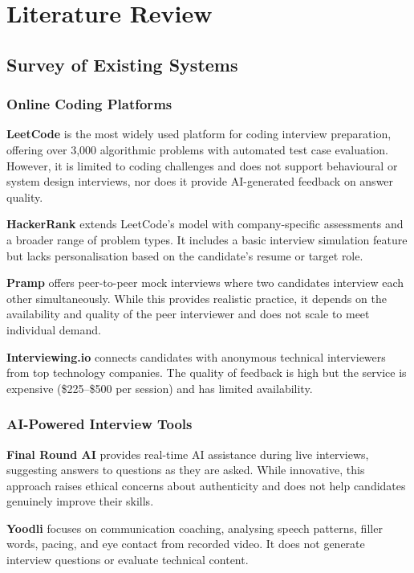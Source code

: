 \chapter{Literature Review}

\section{Survey of Existing Systems}

\subsection{Online Coding Platforms}

\textbf{LeetCode} \cite{leetcode2024} is the most widely used platform for coding interview preparation, offering over 3,000 algorithmic problems with automated test case evaluation. However, it is limited to coding challenges and does not support behavioural or system design interviews, nor does it provide AI-generated feedback on answer quality.

\textbf{HackerRank} \cite{hackerrank2024} extends LeetCode's model with company-specific assessments and a broader range of problem types. It includes a basic interview simulation feature but lacks personalisation based on the candidate's resume or target role.

\textbf{Pramp} \cite{pramp2024} offers peer-to-peer mock interviews where two candidates interview each other simultaneously. While this provides realistic practice, it depends on the availability and quality of the peer interviewer and does not scale to meet individual demand.

\textbf{Interviewing.io} \cite{interviewingio2024} connects candidates with anonymous technical interviewers from top technology companies. The quality of feedback is high but the service is expensive (\$225--\$500 per session) and has limited availability.

\subsection{AI-Powered Interview Tools}

\textbf{Final Round AI} \cite{finalroundai2024} provides real-time AI assistance during live interviews, suggesting answers to questions as they are asked. While innovative, this approach raises ethical concerns about authenticity and does not help candidates genuinely improve their skills.

\textbf{Yoodli} \cite{yoodli2024} focuses on communication coaching, analysing speech patterns, filler words, pacing, and eye contact from recorded video. It does not generate interview questions or evaluate technical content.

